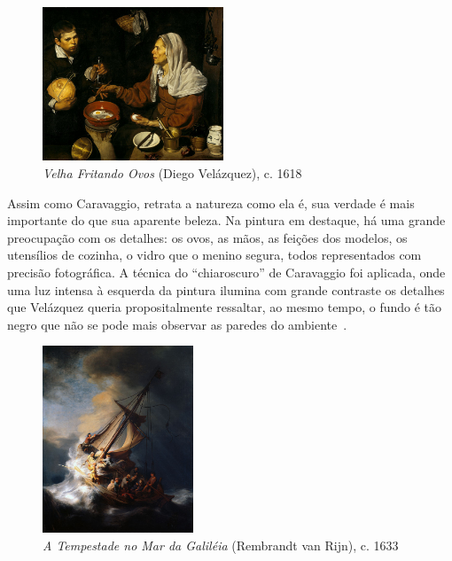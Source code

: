 \begin{figure}
  \begin{center}
    \includegraphics[width=0.48\textwidth]{figs/velazquez_velha.png}
  \end{center}
  \caption{\emph{Velha Fritando Ovos} (Diego Velázquez), c. 1618}
  \label{fig:velazquez:velha}
\end{figure}

Assim como Caravaggio, retrata a natureza como ela
é, sua verdade é mais importante do que sua aparente beleza. Na pintura em
destaque, há uma grande preocupação com os detalhes: os ovos, as mãos, as
feições dos modelos, os utensílios de cozinha, o vidro que o menino segura,
todos representados com precisão fotográfica. A técnica do ``chiaroscuro'' de
Caravaggio foi aplicada, onde uma luz intensa à esquerda da pintura ilumina com
grande contraste os detalhes que Velázquez queria propositalmente ressaltar, ao
mesmo tempo, o fundo é tão negro que não se pode mais observar as paredes do
ambiente~\cite{gombrich}.

\begin{figure}
  \begin{center}
    \includegraphics[width=0.4\textwidth]{figs/rembrandt_tempestade.png}
  \end{center}
  \caption{\emph{A Tempestade no Mar da Galiléia} (Rembrandt van Rijn), c. 1633}
  \label{fig:rembrandt:tempestade}
\end{figure}

